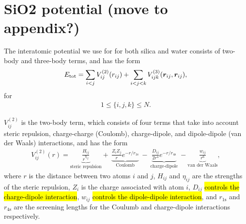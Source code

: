 \section{SiO2 potential (move to appendix?)}

The interatomic potential\cite{vashishta1990interaction}  we use for for both silica and water consists of two-body and three-body terms, and has the form
\begin{align*}
    E_\text{tot} = \sum_{i<j} V_{ij}^{(2)}(r_{ij}) + \sum_{i<j<k}V_{ijk}^{(3)}(\boldsymbol{r}_{ij},\boldsymbol{r}_{ij}),
\end{align*}
for
\begin{align*}
    1\leq \{i,j,k\} \leq N.
\end{align*}


$V_{ij}^{(2)}$ is the two-body term, which consists of four terms that take into account steric repulsion, charge-charge (Coulomb), charge-dipole, and dipole-dipole (van der Waals) interactions, and has the form
\begin{align*}
    V_{ij}^{(2)} (r) = 
    \underbrace{
        \frac{H_{ij}}{r^{\eta_{ij}}}
    }_{\text{steric repulsion}}
    +~ 
    \underbrace{
        \frac{Z_iZ_j}{r}e^{-r/r_{1\text{s}}}
    }_{\text{Coulomb}}
    ~-~
    \underbrace{
        \frac{D_{ij}}{2r^4}e^{-r/r_{4\text{s}}}
    }_{\text{charge-dipole}}
    ~- 
    \underbrace{
        \frac{w_{ij}}{r^6}
    }_{\text{van der Waals}}
    ,
\end{align*}
where $r$ is the distance between two atoms $i$ and $j$, $H_{ij}$ and $\eta_{ij}$ are the strengths of the steric repulsion, $Z_i$ is the charge associated with atom $i$, $D_{ij}$ \hl{controls the charge-dipole interaction}, $w_{ij}$ \hl{controls the dipole-dipole interaction}, and $r_{1\text{s}}$ and $r_{4\text{s}}$ are the screening lengths for the Coulumb and charge-dipole interactions respectively. 

